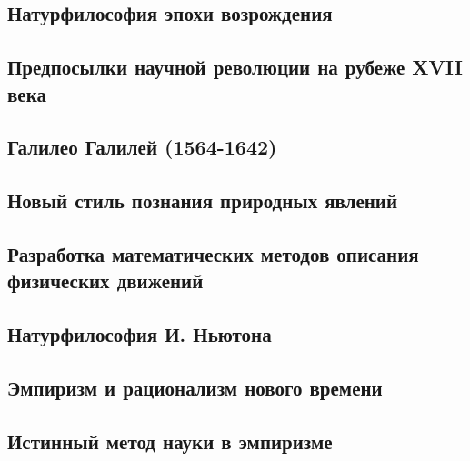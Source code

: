 \documentclass[main.tex]{subfiles}
\begin{document}

\subsection{Натурфилософия эпохи возрождения}


\subsection{Предпосылки научной революции на рубеже XVII века}


\subsection{Галилео Галилей (1564-1642)}


\subsection{Новый стиль познания природных явлений}


\subsection{Разработка математических методов описания физических движений}


\subsection{Натурфилософия И. Ньютона}


\subsection{Эмпиризм и рационализм нового времени}


\subsection{Истинный метод науки в эмпиризме}

\end{document}
